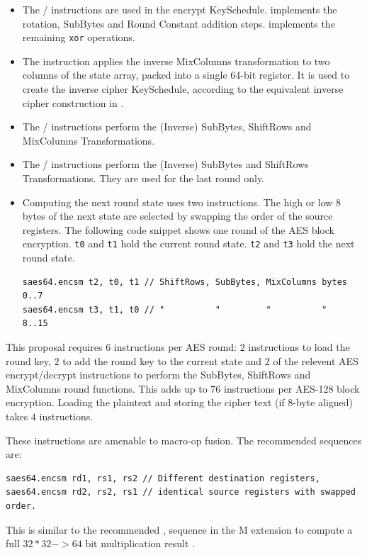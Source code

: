 \begin{itemize}

\item
The
/
instructions are used in the encrypt KeySchedule.
 implements the rotation, SubBytes and Round Constant
addition steps.
 implements the remaining {\tt xor} operations.

\item
The
instruction applies the inverse MixColumns
transformation to two columns of the state array, packed into a single
64-bit register.
It is used to create the inverse cipher KeySchedule, according to
the equivalent inverse cipher construction in
\cite[Page 23, Section 5.3.5]{nist:fips:197}.

\item
The / instructions perform the
(Inverse) SubBytes, ShiftRows and MixColumns Transformations.

\item
The / instructions perform the
(Inverse) SubBytes and ShiftRows Transformations.
They are used for the last round only.

\item
Computing the next round state uses two instructions.
The high or low 8 bytes of the next state are selected by swapping the order
of the source registers.
The following code snippet shows one round of the AES block encryption.
{\tt t0} and {\tt t1} hold the current round state.
{\tt t2} and {\tt t3} hold the next round state.
\begin{lstlisting}
saes64.encsm t2, t0, t1 // ShiftRows, SubBytes, MixColumns bytes 0..7
saes64.encsm t3, t1, t0 // "          "         "          "     8..15
\end{lstlisting}
\end{itemize}

This proposal requires $6$ instructions per AES round:
$2$  instructions to load the round key,
$2$  to add the round key to the current state
and
$2$ of the relevent AES encrypt/decrypt instructions to perform the
    SubBytes, ShiftRows and MixColumns round functions.
This adds up to $76$ instructions per AES-128 block
encryption.
Loading the plaintext and storing the cipher text (if 8-byte aligned)
takes $4$ instructions.

These instructions are amenable to macro-op fusion.
The recommended sequences are:
\begin{lstlisting}[language=pseudo]
saes64.encsm rd1, rs1, rs2 // Different destination registers,
saes64.encsm rd2, rs2, rs1 // identical source registers with swapped order.
\end{lstlisting}
This is similar to the recommended , 
sequence in the M extension to compute a full $32*32->64$ bit
multiplication result \cite[Section 7.1]{riscv:spec:user}.

